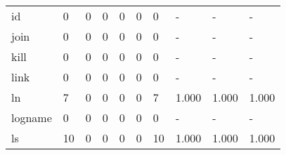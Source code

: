 \begin{longtable}{lp{1.3cm}p{1.3cm}p{1.3cm}p{1.3cm}p{1.3cm}p{1.3cm}p{1.3cm}p{1.3cm}p{1.3cm}}
id        &                      0 &                                  0 &                                 0 &                                0 &                                 0 &                               0 &                                    - &                                      - &                                    - \\
join      &                      0 &                                  0 &                                 0 &                                0 &                                 0 &                               0 &                                    - &                                      - &                                    - \\
kill      &                      0 &                                  0 &                                 0 &                                0 &                                 0 &                               0 &                                    - &                                      - &                                    - \\
link      &                      0 &                                  0 &                                 0 &                                0 &                                 0 &                               0 &                                    - &                                      - &                                    - \\
ln        &                      7 &                                  0 &                                 0 &                                0 &                                 0 &                               7 &                                1.000 &                                  1.000 &                                1.000 \\
logname   &                      0 &                                  0 &                                 0 &                                0 &                                 0 &                               0 &                                    - &                                      - &                                    - \\
ls        &                     10 &                                  0 &                                 0 &                                0 &                                 0 &                              10 &                                1.000 &                                  1.000 &                                1.000 \\

\end{longtable}
